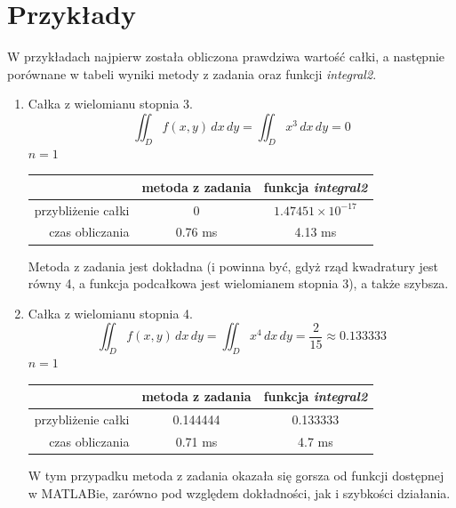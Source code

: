 \documentclass[12pt]{article}
\begin{document}
	
	
	
	\section{Przykłady}
	W przykładach najpierw została obliczona prawdziwa wartość całki, a następnie porównane w tabeli wyniki metody z zadania oraz funkcji \textit{integral2}.
	
	\begin{enumerate}[label=\textbf{Przykład \arabic*}]
		\item
		Całka z wielomianu stopnia 3.
		$$\iint_D f(x, y) \,dx\,dy = \iint_D x^3 \,dx\,dy = 0$$
		$n = 1$
		
		\begin{table}[H]
			\centering
			\begin{tabular}{|r|c|c|}
				\hline
				                   & metoda z zadania & funkcja \textit{integral2} \\ \hline
				przybliżenie całki &        0         & $1.47451 \times 10^{-17}$  \\ \hline
				   czas obliczania &     0.76 ms      &          4.13 ms           \\ \hline
			\end{tabular}
		\end{table}
	
		Metoda z zadania jest dokładna (i powinna być, gdyż rząd kwadratury jest równy 4, a funkcja podcałkowa jest wielomianem stopnia 3), a także szybsza.
		
		
		
		\item
		Całka z wielomianu stopnia 4.
		$$\iint_D f(x, y) \,dx\,dy = \iint_D x^4 \,dx\,dy = \frac{2}{15} \approx 0.133333$$
		$n = 1$
		
		\begin{table}[H]
			\centering
			\begin{tabular}{|r|c|c|}
				\hline
				                   & metoda z zadania & funkcja \textit{integral2} \\ \hline
				przybliżenie całki &     0.144444     &          0.133333          \\ \hline
				   czas obliczania &     0.71 ms      &           4.7 ms           \\ \hline
			\end{tabular}
		\end{table}
	
		W tym przypadku metoda z zadania okazała się gorsza od funkcji dostępnej w MATLABie, zarówno pod względem dokładności, jak i szybkości działania.
		

\end{enumerate}
\end{document}
